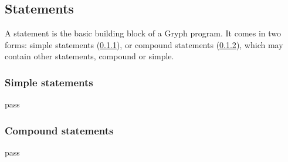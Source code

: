 \subsection{Statements}
\label{sec:statements}
A statement is the basic building block of a Gryph program. It comes in two forms: simple statements (\ref{sec:simple-stmts}), or compound statements (\ref{sec:compound-stmts}), which may contain other statements, compound or simple.
\subsubsection{Simple statements}
\label{sec:simple-stmts}
pass
\subsubsection{Compound statements}
\label{sec:compound-stmts}
pass